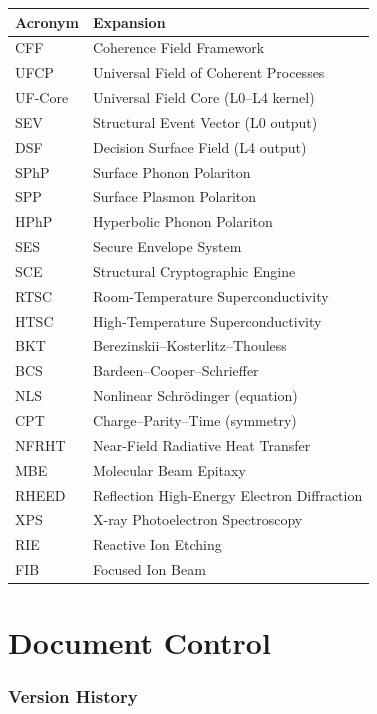 \documentclass[11pt, a4paper]{article}
\begin{document}
\begin{center}
\begin{tabular}{@{}ll@{}}
\toprule
\textbf{Acronym} & \textbf{Expansion} \\
\midrule
CFF & Coherence Field Framework \\
UFCP & Universal Field of Coherent Processes \\
UF-Core & Universal Field Core (L0--L4 kernel) \\
SEV & Structural Event Vector (L0 output) \\
DSF & Decision Surface Field (L4 output) \\
SPhP & Surface Phonon Polariton \\
SPP & Surface Plasmon Polariton \\
HPhP & Hyperbolic Phonon Polariton \\
SES & Secure Envelope System \\
SCE & Structural Cryptographic Engine \\
RTSC & Room-Temperature Superconductivity \\
HTSC & High-Temperature Superconductivity \\
BKT & Berezinskii--Kosterlitz--Thouless \\
BCS & Bardeen--Cooper--Schrieffer \\
NLS & Nonlinear Schr\"odinger (equation) \\
CPT & Charge--Parity--Time (symmetry) \\
NFRHT & Near-Field Radiative Heat Transfer \\
MBE & Molecular Beam Epitaxy \\
RHEED & Reflection High-Energy Electron Diffraction \\
XPS & X-ray Photoelectron Spectroscopy \\
RIE & Reactive Ion Etching \\
FIB & Focused Ion Beam \\
\bottomrule
\end{tabular}
\end{center}

\newpage
\part{Document Control}

\section{Version History}
\end{document}
